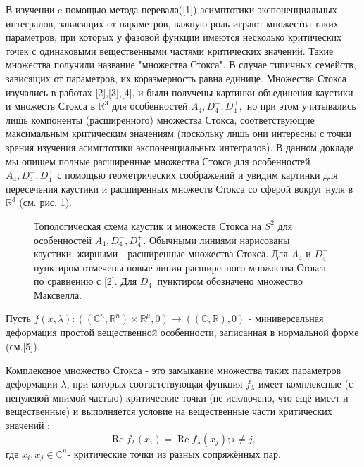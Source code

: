 \vzmscaption

В изучении c помощью метода перевала([1]) асимптотики экспоненциальных интегралов, зависящих от параметров, важную роль играют множества таких параметров, при которых у фазовой функции имеются несколько критических точек с одинаковыми вещественными частями критических значений. Такие множества получили название "множества Стокса". В случае типичных семейств, зависящих от параметров, их коразмерность равна единице. Множества Стокса изучались в работах [2],[3],[4], и были получены картинки объединения каустики и множеств Стокса в $\mathbb{R}^3$ для особенностей $A_{4}, D_{4}^-, D_{4}^+, $ но при этом учитывались лишь компоненты (расширенного) множества Стокса, соответствующие максимальным критическим значениям (поскольку лишь они интересны с точки зрения изучения асимптотики экспоненциальных интегралов). В данном докладе мы опишем полные расширенные множества Стокса для особенностей $A_{4}, D_{4}^-, D_{4}^+ $ с помощью геометрических соображений и увидим картинки для пересечения каустики и расширенных множеств Стокса со сферой вокруг нуля в $\mathbb{R}^3$ (см. рис. 1).

	\begin{figure}
		\caption{Топологическая схема каустик и множеств Стокса на $S^2$ для особенностей $A_{4}, D_{4}^-, D_{4}^+ $. Обычными линиями нарисованы каустики, жирными - расширенные множества Стокса. Для $A_4$ и $D_4^+$ пунктиром отмечены новые линии расширенного множества Стокса по сравнению с [2].  Для $ D_{4}^-$ пунктиром обозначено множество Максвелла.}\label{F7}
	\end{figure}


Пусть $f(x,\lambda):((\mathbb{C}^n,\mathbb{R}^n)\times\mathbb{R}^\mu,0)\rightarrow((\mathbb{C},\mathbb{R}),0)$ - миниверсальная деформация простой вещественной особенности, записанная в нормальной форме (см.[5]).


\begin{definition}
	Комплексное множество Стокса - это замыкание множества таких параметров деформации $\lambda$, при которых соответствующая функция $f_\lambda$ имеет комплексные (с ненулевой мнимой частью) критические точки (не исключено, что ещё имеет и вещественные) и выполняется условие на вещественные части критических значений : $$\mathop{\text{Re}}f_\lambda(x_i)=\mathop{\text{Re}}f_\lambda(x_j);  i\neq j,$$
	где $x_i,x_j\in\mathbb{C}^n$- критические точки из разных сопряжённых пар.
\end{definition}


